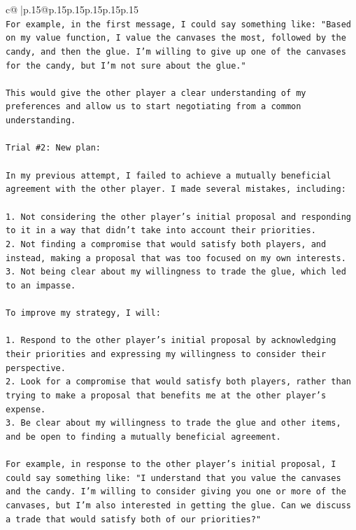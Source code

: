 \documentclass{article}
\begin{document}
{\begin{supertabular}{c@{$\;$}|p{.15\linewidth}@{}p{.15\linewidth}p{.15\linewidth}p{.15\linewidth}p{.15\linewidth}p{.15\linewidth}}
{{{\\ 
\texttt{For example, in the first message, I could say something like: "Based on my value function, I value the canvases the most, followed by the candy, and then the glue. I'm willing to give up one of the canvases for the candy, but I'm not sure about the glue."} \\
\\ 
\texttt{This would give the other player a clear understanding of my preferences and allow us to start negotiating from a common understanding.} \\
\\ 
\texttt{Trial \#2: New plan: } \\
\\ 
\texttt{In my previous attempt, I failed to achieve a mutually beneficial agreement with the other player. I made several mistakes, including:} \\
\\ 
\texttt{1. Not considering the other player's initial proposal and responding to it in a way that didn't take into account their priorities.} \\
\texttt{2. Not finding a compromise that would satisfy both players, and instead, making a proposal that was too focused on my own interests.} \\
\texttt{3. Not being clear about my willingness to trade the glue, which led to an impasse.} \\
\\ 
\texttt{To improve my strategy, I will:} \\
\\ 
\texttt{1. Respond to the other player's initial proposal by acknowledging their priorities and expressing my willingness to consider their perspective.} \\
\texttt{2. Look for a compromise that would satisfy both players, rather than trying to make a proposal that benefits me at the other player's expense.} \\
\texttt{3. Be clear about my willingness to trade the glue and other items, and be open to finding a mutually beneficial agreement.} \\
\\ 
\texttt{For example, in response to the other player's initial proposal, I could say something like: "I understand that you value the canvases and the candy. I'm willing to consider giving you one or more of the canvases, but I'm also interested in getting the glue. Can we discuss a trade that would satisfy both of our priorities?"} \\
}}}
\end{supertabular}}
\end{document}
